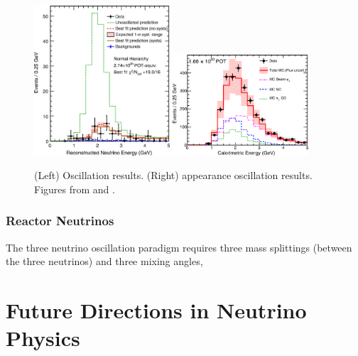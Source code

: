 \begin{figure}[htbp]
  \centering
  \includegraphics[width=0.45\textwidth]{intro_figures/nova_numu.png}
  \includegraphics[width=0.45\textwidth]{intro_figures/nova_nue.png}
  \caption[\nova Oscillation Results]{(Left) \numu Oscillation results. (Right) \nue appearance oscillation results.  Figures from \cite{PhysRevD.93.051104} and \cite{Adamson:2016tbq}.}
  \label{fig:label}
\end{figure}

\subsubsection{Reactor Neutrinos}

The three neutrino oscillation paradigm requires three mass splittings (between the three neutrinos) and three mixing angles, 

\section{Future Directions in Neutrino Physics}
\label{sec:future_experiments}

